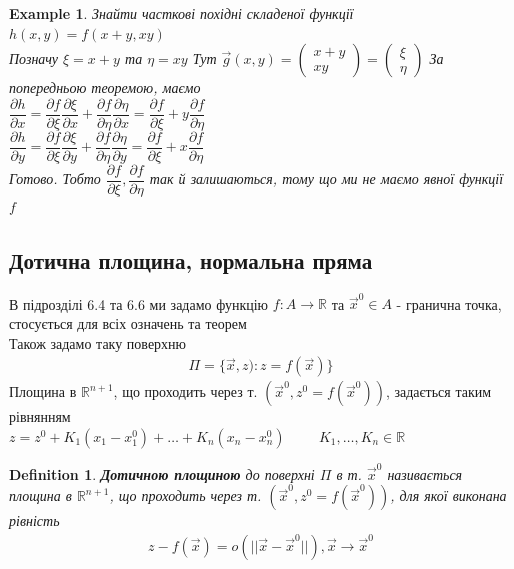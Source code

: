 \documentclass[a4paper, 14pt]{extarticle}
\theoremstyle{theoremdd}
\theoremstyle{theoremdd}
\newtheorem{definition}[theorem]{Definition}
\theoremstyle{theoremdd}
\theoremstyle{theoremdd}
\newtheorem{example}[theorem]{Example}
\theoremstyle{theoremdd}
\theoremstyle{theoremdd}
\theoremstyle{theoremdd}
\theoremstyle{theoremdd}
\def\departial#1#2{\dfrac{\partial {#1}}{\partial {#2}}}
\begin{document}
\begin{example}
Знайти часткові похідні складеної функції\\
$h(x,y) = f(x+y, xy)$\\
Позначу $\xi = x+y$ та $\eta = xy$
Тут $\vec{g}(x,y) = \begin{pmatrix}
 x+y \\ xy
\end{pmatrix} = \begin{pmatrix}
\xi \\ \eta
\end{pmatrix}$
За попередньою теоремою, маємо\\
$\departial{h}{x} = \departial{f}{\xi} \departial{\xi}{x} + \departial{f}{\eta} \departial{\eta}{x} = \departial{f}{\xi} + y\departial{f}{\eta}$\\
$\departial{h}{y} = \departial{f}{\xi} \departial{\xi}{y} + \departial{f}{\eta} \departial{\eta}{y} = \departial{f}{\xi} + x\departial{f}{\eta}$\\
Готово. Тобто $\departial{f}{\xi}, \departial{f}{\eta}$ так й залишаються, тому що ми не маємо явної функції $f$\\
\end{example}

\subsection{Дотична площина, нормальна пряма}
В підрозділі 6.4 та 6.6 ми задамо функцію $f: A \to \mathbb{R}$ та $\vec{x}^0 \in A$ - гранична точка, стосується для всіх означень та теорем\\
Також задамо таку поверхню
\begin{align*}
\Pi = \{\vec{x},z): z = f(\vec{x}) \}
\end{align*}
Площина в $\mathbb{R}^{n+1}$, що проходить через т. $(\vec{x}^0, z^0 = f(\vec{x}^0))$, задається таким рівнянням\\
$z = z^0 + K_1(x_1-x_1^0) + \dots + K_n(x_n-x_n^0) \hspace{1cm} K_1,\dots,K_n \in \mathbb{R}$
\begin{definition}
\textbf{Дотичною площиною} до поверхні $\Pi$ в т. $\vec{x}^0$ називається площина в $\mathbb{R}^{n+1}$, що проходить через т. $(\vec{x}^0, z^0 = f(\vec{x}^0))$, для якої виконана рівність
\begin{align*}
z - f(\vec{x}) = o(||\vec{x}-\vec{x}^0||), \vec{x} \to \vec{x}^0
\end{align*}
\end{definition}
\end{document}
